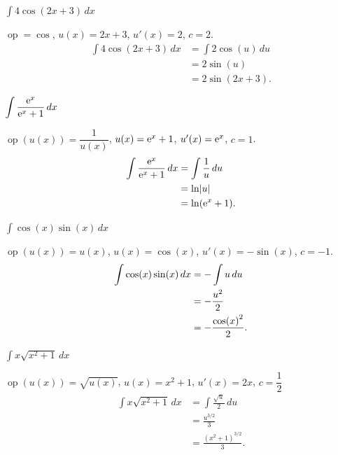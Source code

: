 \documentclass{beamer}
\newcommand{\Left} {\mathopen{}\mathclose\bgroup\left}
\newcommand{\Right}{\aftergroup\egroup\right}
\newcommand{\e}{\textup e}
\newcommand{\op}  {\operatorname{op}}
\theoremstyle{remark}
\begin{document}
\begin{frame}{$\displaystyle \int 4\cos(2x+3)\,dx$}
  \begin{solution}
    $\op = \cos$, $u(x) = 2x+3$, $u'(x) = 2$, $c = 2$.
    \begin{align*}
      \int 4\cos(2x+3)\,dx &= \int 2\cos(u)\,du\\
	&= 2\sin(u)\\
	&= 2\sin(2x+3).
    \end{align*}
  \end{solution}
\end{frame}

\begin{frame}{$\displaystyle \int \frac{\e^x}{\e^x + 1}\,dx$}
  \begin{solution}
    $\op(u(x)) = \dfrac{1}{u(x)}$, $u(x) = \e^x + 1$, $u'(x) = \e^x$, $c = 1$.
    \begin{align*}
      \int \frac{\e^x}{\e^x + 1}\,dx &= \int \frac1u\,du\\
	&= \ln \Left| u \Right|\\
	&= \ln(\e^x + 1).
    \end{align*}
  \end{solution}
\end{frame}

\begin{frame}{$\displaystyle \int \cos(x) \sin(x)\,dx$}
  \begin{solution}
    $\op(u(x)) = u(x)$, $u(x) = \cos(x)$, $u'(x) = -\sin(x)$, $c = -1$.
    \begin{align*}
      \int \cos(x) \sin(x)\,dx &= -\int u\,du\\
	&= -\frac{u^2}{2}\\
	&= -\frac{\cos \Left( x \Right)^2}{2}.
    \end{align*}
  \end{solution}
\end{frame}

\begin{frame}{$\displaystyle \int x \sqrt{x^2+1}\,dx$}
  \begin{solution}
    $\op(u(x)) = \sqrt{u(x)}$, $u(x) = x^2+1$, $u'(x) = 2x$, $c = \dfrac12$
    \begin{align*}
      \int x \sqrt{x^2+1}\,dx &= \int \frac{\sqrt u}{2}\,du\\
	&= \frac{u^{3/2}}{3}\\
	&= \frac{\left( x^2 + 1 \right)^{3/2}}{3}.
    \end{align*}
  \end{solution}
\end{frame}
\end{document}
